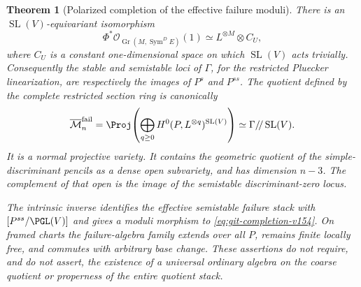 \documentclass[11pt,reqno]{amsart}
\numberwithin{equation}{section}
\newtheorem{theorem}{Theorem}[section]
\theoremstyle{definition}\newtheorem{definition}[theorem]{Definition}
\theoremstyle{remark}\newtheorem{remark}[theorem]{Remark}
\newcommand{\OO}{\mathcal O}\newcommand{\II}{\mathcal I}
\DeclareMathOperator{\Sym}{Sym}\DeclareMathOperator{\Gr}{Gr}
\begin{document}
\begin{theorem}[Polarized completion of the effective failure moduli]
\label{thm:polarized-completion-v154}
There is an $\operatorname{SL}(V)$-equivariant isomorphism
\begin{equation}\label{eq:polarization-v154}
 \Phi^*\OO_{\Gr(M,\Sym^D E)}(1)\simeq L^{\otimes M}
                 \otimes C_U,
\end{equation}
where $C_U$ is a constant one-dimensional space on which
$\operatorname{SL}(V)$ acts trivially. Consequently the stable and
semistable loci of $\Gamma$, for the restricted Pluecker
linearization, are respectively the images of $P^s$ and $P^{ss}$.
The quotient defined by the complete restricted section ring is
canonically
\begin{equation}\label{eq:git-completion-v154}
 \overline{\mathcal M}^{\mathrm{fail}}_n
 =\Proj\!\left(\bigoplus_{q\geq0}
                  H^0(P,L^{\otimes q})^{\operatorname{SL}(V)}\right)
 \simeq\Gamma/\!/\operatorname{SL}(V).
\end{equation}
It is a normal projective variety. It contains the geometric quotient
of the simple-discriminant pencils as a dense open subvariety, and
has dimension $n-3$. The complement of that open is the image of the
semistable discriminant-zero locus.

The intrinsic inverse identifies the effective semistable failure
stack with $[P^{ss}/\PGL(V)]$ and gives a moduli morphism to
\eqref{eq:git-completion-v154}. On framed charts the failure-algebra
family extends over all $P$, remains finite locally free, and
commutes with arbitrary base change. These assertions do not require,
and do not assert, the existence of a universal ordinary algebra on
the coarse quotient or properness of the entire quotient stack.
\end{theorem}
\end{document}
